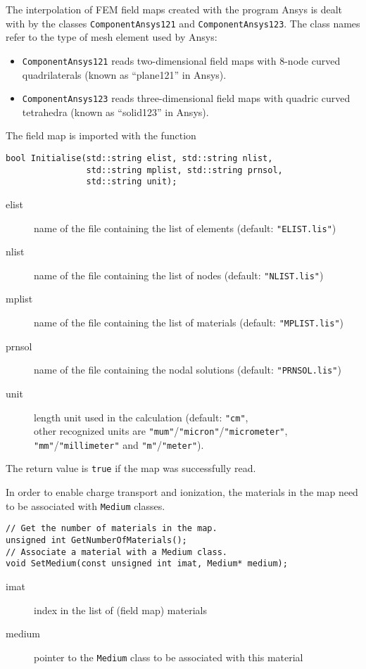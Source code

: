 The interpolation of FEM field maps 
created with the program Ansys \cite{ANSYS} 
is dealt with by the classes
\texttt{ComponentAnsys121} and \texttt{ComponentAnsys123}. 
The class names refer to the type of mesh element used by Ansys:
  \begin{itemize}
  \item
  \texttt{ComponentAnsys121} reads two-dimensional field maps 
with 8-node curved quadrilaterals (known as ``plane121'' in Ansys). 
  \item
  \texttt{ComponentAnsys123} reads three-dimensional field maps 
with quadric curved tetrahedra (known as ``solid123'' in Ansys).
  \end{itemize}
The field map is imported with the function
\begin{lstlisting}
bool Initialise(std::string elist, std::string nlist,
                std::string mplist, std::string prnsol,
                std::string unit);
\end{lstlisting}
\begin{description}
  \item[elist]
  name of the file containing the list of elements 
  (default: \texttt{"ELIST.lis"})
  \item[nlist]
  name of the file containing the list of nodes
  (default: \texttt{"NLIST.lis"})
  \item[mplist]
  name of the file containing the list of materials
  (default: \texttt{"MPLIST.lis"})
  \item[prnsol]
  name of the file containing the nodal solutions
  (default: \texttt{"PRNSOL.lis"})
  \item[unit]
  length unit used in the calculation (default: \texttt{"cm"}, \\ 
  other recognized units are 
  \texttt{"mum"}/\texttt{"micron"}/\texttt{"micrometer"},
  \texttt{"mm"}/\texttt{"millimeter"} and 
  \texttt{"m"}/\texttt{"meter"}).
\end{description}
The return value is \texttt{true} if the map was successfully read. 

In order to enable charge transport and ionization,
the materials in the map need to be associated with \texttt{Medium} classes.
\begin{lstlisting}
// Get the number of materials in the map.
unsigned int GetNumberOfMaterials();
// Associate a material with a Medium class.
void SetMedium(const unsigned int imat, Medium* medium);
\end{lstlisting}
\begin{description}
\item[imat]
index in the list of (field map) materials
\item[medium]
pointer to the \texttt{Medium} class to be associated with this material
\end{description}

